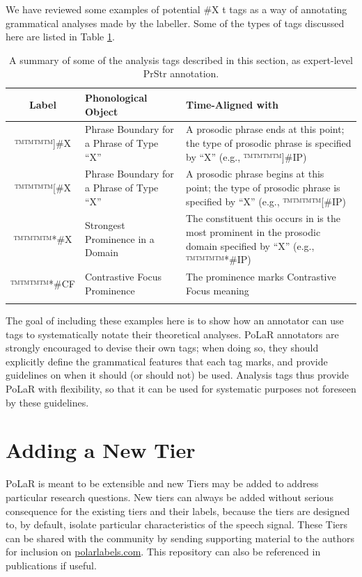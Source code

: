 \documentclass[11pt, twoside]{memoir}
\begin{document}
We have reviewed some examples of potential \#X t tags as a way of annotating grammatical analyses made by the labeller. Some of the types of tags discussed here are listed in Table \ref{tab:beyond polar tags}.

\begin{longtable}{cp{.3\linewidth}p{.5\linewidth}}
\toprule \textbf{Label} & \textbf{Phonological Object} & \textbf{Time-Aligned with} \tabularnewline
\midrule
\endhead
™™™™{]\#X} & Phrase Boundary for a Phrase of Type “X” & A prosodic phrase ends at this point; the type of prosodic phrase is specified by “X” (e.g., ™™™™{]\#IP}) \tabularnewline\hdashline
™™™™{[\#X} & Phrase Boundary for a Phrase of Type “X” & A prosodic phrase begins at this point; the type of prosodic phrase is specified by “X” (e.g., ™™™™{[\#IP}) \tabularnewline\hdashline
™™™™{*\#X} & Strongest Prominence in a Domain & The constituent this occurs in is the most prominent in the prosodic domain specified by “X” (e.g., ™™™™{*\#IP}) \tabularnewline\hdashline
™™™™{*\#CF} & Contrastive Focus Prominence & The prominence marks Contrastive Focus meaning \tabularnewline
 \bottomrule 
\caption{A summary of some of the analysis tags described in this section, as expert-level PrStr annotation.}
\label{tab:beyond polar tags}
\end{longtable}

The goal of including these examples here is to show how an annotator can use tags to systematically notate their theoretical analyses. PoLaR annotators are strongly encouraged to devise their own tags; when doing so, they should explicitly define the grammatical features that each tag marks, and provide guidelines on when it should (or should not) be used. Analysis tags thus provide PoLaR with flexibility, so that it can be used for systematic purposes not foreseen by these guidelines.

\section{Adding a New Tier}\label{sec:adding-a-new-tier}

PoLaR is meant to be extensible and new Tiers may be added to address particular research questions. New tiers can always be added without serious consequence for the existing tiers and their labels, because the tiers are designed to, by default, isolate particular characteristics of the speech signal. These Tiers can be shared with the community by sending  supporting material to the authors for inclusion on \href{https://www.polarlabels.com}{polarlabels.com}. This repository can also be referenced in publications if useful. 
 
\end{document}
